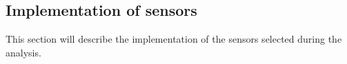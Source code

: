 \subsection{Implementation of sensors}\label{sub:implementation_of_sensors}
This section will describe the implementation of the sensors selected during the analysis.

